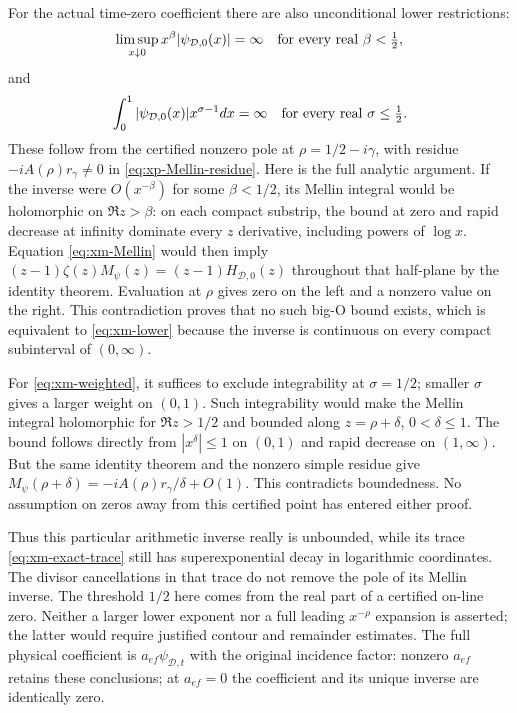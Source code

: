 For the actual time-zero coefficient there are also unconditional
lower restrictions:
\begin{equation}\label{eq:xm-lower}
 \limsup_{x\downarrow0}x^\beta|\psi_{\mathcal D,0}(x)|=\infty
       \quad\hbox{for every real }\beta<\tfrac12,
\end{equation}
and
\begin{equation}\label{eq:xm-weighted}
 \int_0^1|\psi_{\mathcal D,0}(x)|x^{\sigma-1}dx=\infty
       \quad\hbox{for every real }\sigma\le\tfrac12.
\end{equation}
These follow from the certified nonzero pole at
$\rho=1/2-i\gamma$, with residue
$-iA(\rho)r_\gamma\ne0$ in \eqref{eq:xp-Mellin-residue}.
Here is the full analytic argument. If the inverse were
$O(x^{-\beta})$ for some $\beta<1/2$, its Mellin integral would
be holomorphic on $\Re z>\beta$: on each compact substrip, the
bound at zero and rapid decrease at infinity dominate every
$z$ derivative, including powers of $\log x$.
Equation \eqref{eq:xm-Mellin} would then imply
$(z-1)\zeta(z)M_{\psi}(z)=(z-1)H_{\mathcal D,0}(z)$
throughout that half-plane by the identity theorem. Evaluation at
$\rho$ gives zero on the left and a nonzero value on the right.
This contradiction proves that no such big-O bound exists, which is
equivalent to \eqref{eq:xm-lower} because the inverse is continuous
on every compact subinterval of $(0,\infty)$.

For \eqref{eq:xm-weighted}, it suffices to exclude integrability
at $\sigma=1/2$; smaller $\sigma$ gives a larger weight on $(0,1)$.
Such integrability would make the Mellin integral holomorphic for
$\Re z>1/2$ and bounded along $z=\rho+\delta$, $0<\delta\le1$.
The bound follows directly from $|x^\delta|\le1$ on $(0,1)$ and
rapid decrease on $(1,\infty)$. But the same identity theorem and
the nonzero simple residue give
$M_\psi(\rho+\delta)=-iA(\rho)r_\gamma/\delta+O(1)$.
This contradicts boundedness. No assumption on zeros away from
this certified point has entered either proof.

Thus this particular arithmetic inverse really is unbounded, while
its trace \eqref{eq:xm-exact-trace} still has superexponential decay
in logarithmic coordinates. The divisor cancellations in that trace
do not remove the pole of its Mellin inverse. The threshold $1/2$
here comes from the real part of a certified on-line zero. Neither
a larger lower exponent nor a full leading $x^{-\rho}$ expansion
is asserted; the latter would require justified contour and
remainder estimates. The full physical coefficient is
$a_{ef}\psi_{\mathcal D,t}$ with the original incidence factor:
nonzero $a_{ef}$ retains these conclusions; at $a_{ef}=0$ the
coefficient and its unique inverse are identically zero.


